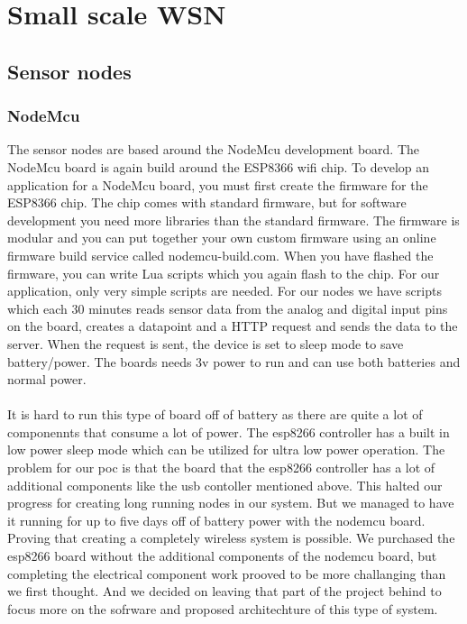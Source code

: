 \documentclass[]{uiophd}
\begin{document}
\section{Small scale WSN}
\subsection{Sensor nodes}
\subsubsection{NodeMcu}
The sensor nodes are based around the NodeMcu development board. The NodeMcu board is again build around the ESP8366 wifi chip. To develop an application for a NodeMcu board, you must first create the firmware for the ESP8366 chip. The chip comes with standard firmware, but for software development you need more libraries than the standard firmware. The firmware is modular and you can put together your own custom firmware using an online firmware build service called nodemcu-build.com. When you have flashed the firmware, you can write Lua scripts which you again flash to the chip. For our application, only very simple scripts are needed. For our nodes we have scripts which each 30 minutes reads sensor data from the analog and digital input pins on the board, creates a datapoint and a HTTP request and sends the data to the server. When the request is sent, the device is set to sleep mode to save battery/power. The boards needs 3v power to run and can use both batteries and normal power.
\\\\
It is hard to run this type of board off of battery as there are quite a lot of componennts that consume a lot of power. The esp8266 controller has a built in low power sleep mode which can be utilized for ultra low power operation. The problem for our poc is that the board that the esp8266 controller has a lot of additional components like the usb contoller mentioned above. This halted our progress for creating long running nodes in our system. But we managed to have it running for up to five days off of battery power with the nodemcu board. Proving that creating a completely wireless system is possible. We purchased the esp8266 board without the additional components of the nodemcu board, but completing the electrical component work prooved to be more challanging than we first thought. And we decided on leaving that part of the project behind to focus more on the sofrware and proposed architechture of this type of system.
\end{document}
